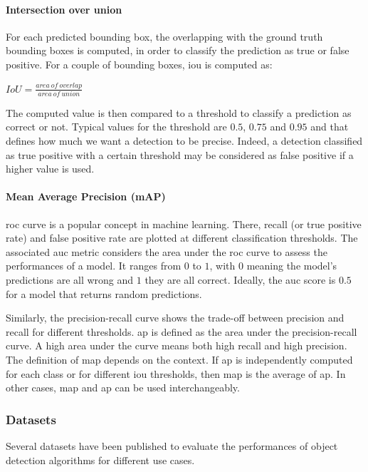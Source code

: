 \documentclass[%
    corpo=12pt,
    twoside,
    stile=classica,   
    tipotesi=magistrale,
    evenboxes,
    english
]{toptesi}
\begin{document}
\paragraph{Intersection over union}
For each predicted bounding box, the overlapping with the ground truth bounding boxes is computed, in order to classify the prediction as true or false positive. For a couple of bounding boxes, \gls{iou} is computed as:
\begin{center}
	$IoU = \frac{area\ of\ overlap}{area\ of\ union}$
\end{center}
The computed value is then compared to a threshold to classify a prediction as correct or not. Typical values for the threshold are $0.5$, $0.75$ and $0.95$ and that defines how much we want a detection to be precise. Indeed, a detection classified as true positive with a certain threshold may be considered as false positive if a higher value is used.

\paragraph{Mean Average Precision (mAP)}
\gls{roc} curve is a popular concept in machine learning. There, recall (or true positive rate) and false positive rate are plotted at different classification thresholds. The associated \gls{auc} metric considers the area under the \gls{roc} curve to assess the performances of a model.\cite{roc} It ranges from $ 0 $ to $ 1 $, with $ 0 $ meaning the model's predictions are all wrong and $ 1 $ they are all correct. Ideally, the \gls{auc} score is $ 0.5 $ for a model that returns random predictions.

Similarly, the precision-recall curve shows the trade-off between precision and recall for different thresholds\cite{precrecall}. \gls{ap} is defined as the area under the precision-recall curve. A high area under the curve means both high recall and high precision. The definition of \gls{map} depends on the context. If \gls{ap} is independently computed for each class or for different \gls{iou} thresholds, then \gls{map} is the average of \gls{ap}. In other cases, \gls{map} and \gls{ap} can be used interchangeably.


\subsubsection{Datasets}\label{sec:datasets}
Several datasets have been published to evaluate the performances of object detection algorithms for different use cases.
\end{document}
